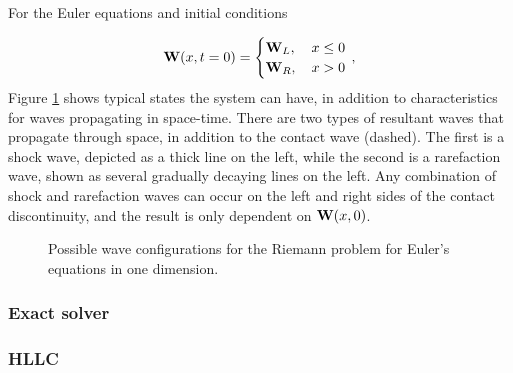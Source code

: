 \documentclass[final,3p,twocolumn,times]{elsarticle}
\begin{document}
For the Euler equations and initial conditions 

\begin{equation*}
    {\bf W}(x,t=0) = 
    \begin{cases}
        {\bf W}_L, \,&x \leq 0 \\ 
        {\bf W}_R, \,&x > 0 \\ 
    \end{cases} \,,
\end{equation*}
%
Figure \ref{fig:riemann} shows typical states the system can have, in addition
to characteristics for waves propagating in space-time. There are two types of
resultant waves that propagate through space, in addition to the contact wave
(dashed). The first is a shock wave, depicted as a thick line on the left,
while the second is a rarefaction wave, shown as several gradually decaying
lines on the left. Any combination of shock and rarefaction waves can occur on
the left and right sides of the contact discontinuity, and the result is only
dependent on ${\bf W}(x,0)$. 

\begin{figure}[htb]
    \centering
    \caption{Possible wave configurations for the Riemann problem for Euler's
    equations in one dimension.}
    \label{fig:riemann}
\end{figure}

\subsubsection{Exact solver}
\label{subsubsec:exact}

\subsubsection{HLLC}
\label{subsubsec:hllc}
\end{document}
